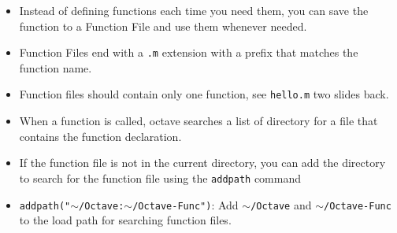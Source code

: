 \documentclass[slidestop,mathserif,compress,xcolor=svgnames]{beamer}
\begin{document}
\begin{frame}
\begin{itemize}
{\begin{columns}
\begin{verbatim}
function average = avg (a)
  average = sum(a)/length(a) ;
endfunction

function [max,id] = vmax(a)
  id = 1;
  max = a(id);
  for i = 2:length(a)
    if ( a(i) > max )
      max = a(i) ;
      id = i ;
    endif
  endfor
endfunction
       \end{verbatim}
       \column{6cm}
       \begin{verbatim}
b = rand(20,1);
[max,id] = vmax(b); 
printf ( ``Average of vector v = %f\n'', avg(v)) 
printf ( ``Maximum value of vector b = %f with \
   id = %d\n'',max,id )


[apacheco@tezpur1 octave] ./func.sh 
Average of vector v = 0.512198
Maximum value of vector b = 0.996040 with id = 7
       \end{verbatim}
     \end{columns}
   }
   \item Instead of defining functions each time you need them, you can save the function to a Function File and use them whenever needed.
   \item Function Files end with a \texttt{.m} extension with a prefix that matches the function name.
   \item Function files should contain only one function, see \texttt{hello.m} two slides back.
   \item When a function is called, octave searches a list of directory for a file that contains the function declaration.
   \item If the function file is not in the current directory, you can add the directory to search for the function file using the \texttt{addpath} command
   \item[] \texttt{addpath("$\sim$/Octave:$\sim$/Octave-Func")}: Add \texttt{$\sim$/Octave} and \texttt{$\sim$/Octave-Func} to the load path for searching function files.
  \end{itemize}
\end{frame}
\end{document}
